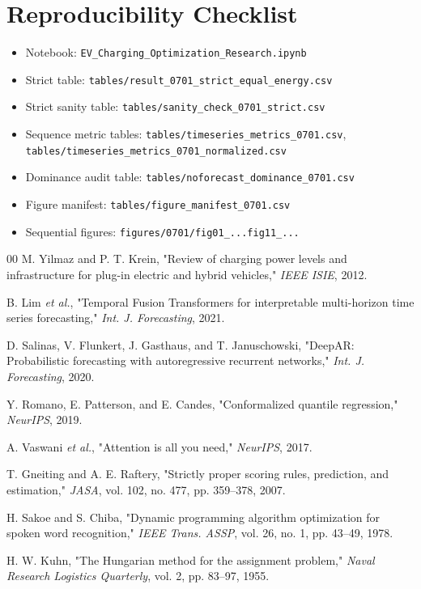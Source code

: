 \documentclass[journal]{IEEEtran}
\begin{document}
\section*{Reproducibility Checklist}
\begin{itemize}
    \item Notebook: \texttt{EV\_Charging\_Optimization\_Research.ipynb}
    \item Strict table: \texttt{tables/result\_0701\_strict\_equal\_energy.csv}
    \item Strict sanity table: \texttt{tables/sanity\_check\_0701\_strict.csv}
    \item Sequence metric tables: \texttt{tables/timeseries\_metrics\_0701.csv}, \texttt{tables/timeseries\_metrics\_0701\_normalized.csv}
    \item Dominance audit table: \texttt{tables/noforecast\_dominance\_0701.csv}
    \item Figure manifest: \texttt{tables/figure\_manifest\_0701.csv}
    \item Sequential figures: \texttt{figures/0701/fig01\_...fig11\_...}
\end{itemize}


\begin{thebibliography}{00}
M. Yilmaz and P. T. Krein, "Review of charging power levels and infrastructure for plug-in electric and hybrid vehicles," \emph{IEEE ISIE}, 2012.

B. Lim \emph{et al.}, "Temporal Fusion Transformers for interpretable multi-horizon time series forecasting," \emph{Int. J. Forecasting}, 2021.

D. Salinas, V. Flunkert, J. Gasthaus, and T. Januschowski, "DeepAR: Probabilistic forecasting with autoregressive recurrent networks," \emph{Int. J. Forecasting}, 2020.

Y. Romano, E. Patterson, and E. Candes, "Conformalized quantile regression," \emph{NeurIPS}, 2019.

A. Vaswani \emph{et al.}, "Attention is all you need," \emph{NeurIPS}, 2017.

T. Gneiting and A. E. Raftery, "Strictly proper scoring rules, prediction, and estimation," \emph{JASA}, vol. 102, no. 477, pp. 359--378, 2007.

H. Sakoe and S. Chiba, "Dynamic programming algorithm optimization for spoken word recognition," \emph{IEEE Trans. ASSP}, vol. 26, no. 1, pp. 43--49, 1978.

H. W. Kuhn, "The Hungarian method for the assignment problem," \emph{Naval Research Logistics Quarterly}, vol. 2, pp. 83--97, 1955.
\end{thebibliography}
\end{document}
